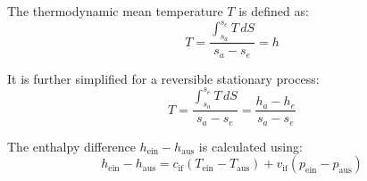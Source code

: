 The thermodynamic mean temperature \( T \) is defined as:  
\[
T = \frac{\int_{s_a}^{s_e} T \, dS}{s_a - s_e} = h
\]  

It is further simplified for a reversible stationary process:  
\[
T = \frac{\int_{s_a}^{s_e} T \, dS}{s_a - s_e} = \frac{h_a - h_e}{s_a - s_e}
\]  

The enthalpy difference \( h_{\text{ein}} - h_{\text{aus}} \) is calculated using:  
\[
h_{\text{ein}} - h_{\text{aus}} = c_{\text{if}} (T_{\text{ein}} - T_{\text{aus}}) + v_{\text{if}} (p_{\text{ein}} - p_{\text{aus}})
\]
